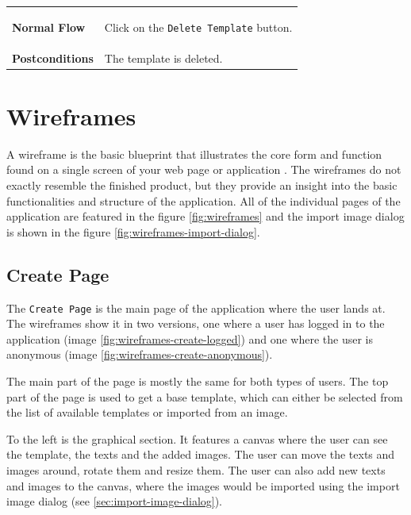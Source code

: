 \begin{longtable}{@{}>{\raggedright\arraybackslash}p{3cm} p{11cm}}
    \textbf{Normal Flow}    & \begin{usecaseenum}
        \item Click on the \texttt{Delete Template} button.
    \end{usecaseenum}
    \\

    \textbf{Postconditions} & The template is deleted.
    \\
\end{longtable}



\section{Wireframes}

A wireframe is the basic blueprint that illustrates the core form and function found on a single screen of your web page or application \cite{wireframing}. The wireframes do not exactly resemble the finished product, but they provide an insight into the basic functionalities and structure of the application. All of the individual pages of the application are featured in the figure \ref{fig:wireframes} and the import image dialog is shown in the figure \ref{fig:wireframes-import-dialog}.

\subsection{Create Page}

The \texttt{Create Page} is the main page of the application where the user lands at. The wireframes show it in two versions, one where a user has logged in to the application (image \ref{fig:wireframes-create-logged}) and one where the user is anonymous (image \ref{fig:wireframes-create-anonymous}).

The main part of the page is mostly the same for both types of users. The top part of the page is used to get a base template, which can either be selected from the list of available templates or imported from an image.

To the left is the graphical section. It features a canvas where the user can see the template, the texts and the added images. The user can move the texts and images around, rotate them and resize them. The user can also add new texts and images to the canvas, where the images would be imported using the import image dialog (see \autoref{sec:import-image-dialog}).

